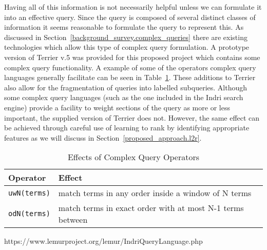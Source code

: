 \documentclass{mprop}
\newcommand{\code}[1]{\texttt{#1}}
\begin{document}
Having all of this information is not necessarily helpful unless we can formulate it into an effective query.
Since the query is composed of several distinct classes of information it seems reasonable to formulate the query to represent this.
As discussed in Section~\ref{background_survey.complex_queries} there are existing technologies which allow this type of complex query formulation. 
A prototype version of Terrier v.5 was provided for this proposed project which contains some complex query functionality. 
A example of some of the operators complex query languages generally facilitate can be seen in Table~\ref{complexqueryoperators}.
These additions to Terrier also allow for the fragmentation of queries into labelled subqueries.
Although some complex query languages (such as the one included in the Indri search engine) provide a facility to weight sections of the query as more or less important, the supplied version of Terrier does not.
However, the same effect can be achieved through careful use of learning to rank by identifying appropriate features as we will discuss in Section~\ref{proposed_approach.l2r}.
\begin{table}[H]
\centering
\begin{tabular}{|l|l|}
\hline
Operator & Effect \\ \hline
\code{uwN(terms)} & match terms in any order inside a window of N terms \\ \hline
\code{odN(terms)} & match terms in exact order with at most N-1 terms between \\ \hline
\end{tabular}
\caption[Caption for LOF]{Effects of Complex Query Operators}
\small https://www.lemurproject.org/lemur/IndriQueryLanguage.php
\label{complexqueryoperators}
\end{table}
\end{document}

